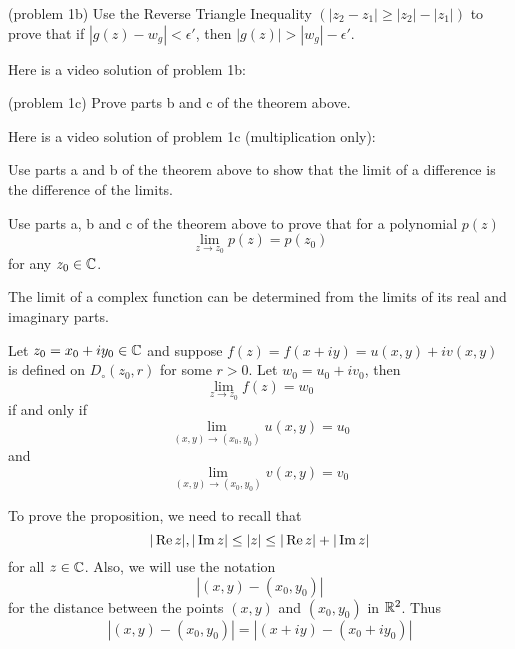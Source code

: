 \documentclass[handout]{ximera}
\begin{document}
\begin{problem}(problem 1b) 
Use the Reverse Triangle Inequality $\left(|z_2 - z_1| \geq |z_2| -|z_1|\right)$ to prove 
that if $|g(z) - w_g| < \epsilon'$, then $|g(z)| > |w_g| - \epsilon'$.
\end{problem}

Here is a video solution of problem 1b:\\
\begin{foldable}
\end{foldable}

\begin{problem}(problem 1c) 
Prove parts b and c of the theorem above.
\end{problem}

Here is a video solution of problem 1c (multiplication only):\\
\begin{foldable}
\end{foldable}

\begin{problem}
Use parts a and b of the theorem above to show that the limit of a difference is the difference
of the limits.
\end{problem}


\begin{problem}
Use parts a, b and c of the theorem above to prove that for a polynomial $p(z)$
\[
\lim_{z\to z_0} p(z) = p(z_0)
\]
for any $z_0 \in \mathbb C$.
\end{problem}

The limit of a complex function can be determined from the limits of its real and imaginary parts.
\begin{proposition}
Let $z_0 = x_0 + iy_0 \in \mathbb C$ and suppose $f(z)=f(x+iy) = u(x,y) + iv(x,y)$ is defined 
on $D_\circ(z_0,r)$ for some $r>0$. Let $w_0 = u_0 + iv_0$, then
\[
\lim_{z \to z_0} f(z) = w_0 
\]
if and only if
\[
\lim_{(x,y) \to (x_0, y_0)} u(x,y) =  u_0 
\]
and
\[
\lim_{(x,y) \to (x_0, y_0)} v(x,y) =  v_0 
\]
\end{proposition}

To prove the proposition, we need to recall that 
\[
|\operatorname{Re} z|, |\operatorname{Im} z| \leq |z| \leq |\operatorname{Re} z| + |\operatorname{Im} z|
\]
for all $z \in \mathbb C$.
Also, we will use the notation 
\[
|(x,y) - (x_0,y_0)|
\]
 for the distance between the points
$(x,y)$ and $(x_0,y_0)$ in $\mathbb R^2$.  Thus
\[
|(x,y) - (x_0,y_0)| = |(x+iy) - (x_0 + iy_0)|
\]

\end{document}
